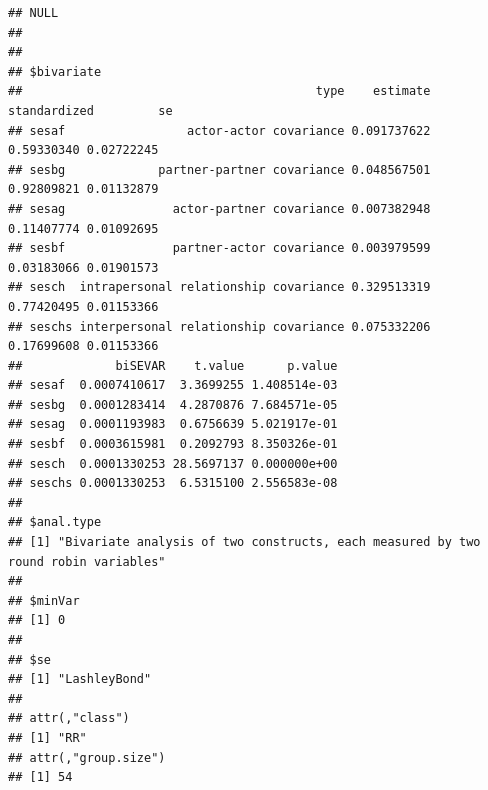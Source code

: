 \documentclass[a4paper]{article}\usepackage[]{graphicx}\usepackage[]{color}
\makeatletter
\newenvironment{kframe}{%
 \def\at@end@of@kframe{}%
 \ifinner\ifhmode%
  \def\at@end@of@kframe{\end{minipage}}%
  \begin{minipage}{\columnwidth}%
 \fi\fi%
 \def\FrameCommand##1{\hskip\@totalleftmargin \hskip-\fboxsep
 \colorbox{shadecolor}{##1}\hskip-\fboxsep
     \hskip-\linewidth \hskip-\@totalleftmargin \hskip\columnwidth}%
 \MakeFramed {\advance\hsize-\width
   \@totalleftmargin\z@ \linewidth\hsize
   \@setminipage}}%
 {\par\unskip\endMakeFramed%
 \at@end@of@kframe}
\newenvironment{knitrout}{}{} %
\makeatother
\begin{document}
\begin{knitrout}
\begin{kframe}
\begin{verbatim}
## NULL
## 
## 
## $bivariate
##                                         type    estimate standardized         se
## sesaf                 actor-actor covariance 0.091737622   0.59330340 0.02722245
## sesbg             partner-partner covariance 0.048567501   0.92809821 0.01132879
## sesag               actor-partner covariance 0.007382948   0.11407774 0.01092695
## sesbf               partner-actor covariance 0.003979599   0.03183066 0.01901573
## sesch  intrapersonal relationship covariance 0.329513319   0.77420495 0.01153366
## seschs interpersonal relationship covariance 0.075332206   0.17699608 0.01153366
##             biSEVAR    t.value      p.value
## sesaf  0.0007410617  3.3699255 1.408514e-03
## sesbg  0.0001283414  4.2870876 7.684571e-05
## sesag  0.0001193983  0.6756639 5.021917e-01
## sesbf  0.0003615981  0.2092793 8.350326e-01
## sesch  0.0001330253 28.5697137 0.000000e+00
## seschs 0.0001330253  6.5315100 2.556583e-08
## 
## $anal.type
## [1] "Bivariate analysis of two constructs, each measured by two round robin variables"
## 
## $minVar
## [1] 0
## 
## $se
## [1] "LashleyBond"
## 
## attr(,"class")
## [1] "RR"
## attr(,"group.size")
## [1] 54
\end{verbatim}
\end{kframe}
\end{knitrout}
\par\vspace{5mm}
\end{document}
